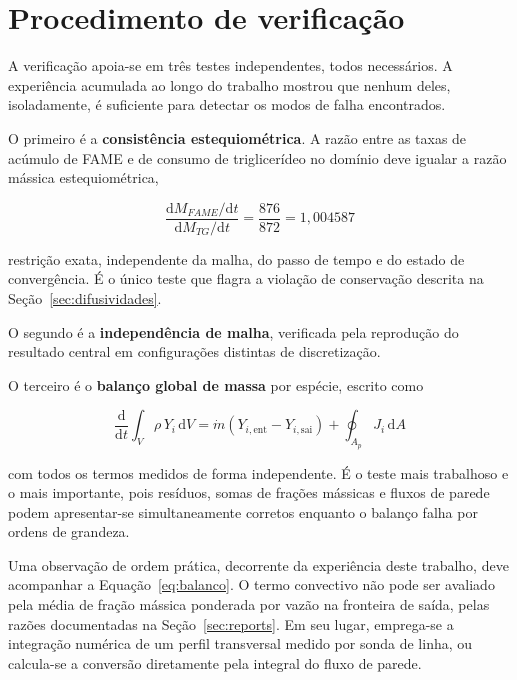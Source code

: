 \section{Procedimento de verificação}
\label{sec:verificacao}

A verificação apoia-se em três testes independentes, todos necessários. A
experiência acumulada ao longo do trabalho mostrou que nenhum deles,
isoladamente, é suficiente para detectar os modos de falha encontrados.

O primeiro é a \textbf{consistência estequiométrica}. A razão entre as taxas de
acúmulo de FAME e de consumo de triglicerídeo no domínio deve igualar a razão
mássica estequiométrica,

\begin{equation}
\frac{\mathrm{d}M_{FAME}/\mathrm{d}t}{\mathrm{d}M_{TG}/\mathrm{d}t}
= \frac{876}{872} = 1{,}004587
\label{eq:esteq}
\end{equation}

\noindent
restrição exata, independente da malha, do passo de tempo e do estado de
convergência. É o único teste que flagra a violação de conservação descrita na
Seção~\ref{sec:difusividades}.

O segundo é a \textbf{independência de malha}, verificada pela reprodução do
resultado central em configurações distintas de discretização.

O terceiro é o \textbf{balanço global de massa} por espécie, escrito como

\begin{equation}
\frac{\mathrm{d}}{\mathrm{d}t} \int_V \rho\, Y_i\, \mathrm{d}V
= \dot{m}\left( Y_{i,\text{ent}} - Y_{i,\text{sai}} \right) + \oint_{A_p} J_i\, \mathrm{d}A
\label{eq:balanco}
\end{equation}

\noindent
com todos os termos medidos de forma independente. É o teste mais trabalhoso e o
mais importante, pois resíduos, somas de frações mássicas e fluxos de parede
podem apresentar-se simultaneamente corretos enquanto o balanço falha por ordens
de grandeza.

Uma observação de ordem prática, decorrente da experiência deste trabalho, deve
acompanhar a Equação~\eqref{eq:balanco}. O termo convectivo não pode ser
avaliado pela média de fração mássica ponderada por vazão na fronteira de saída,
pelas razões documentadas na Seção~\ref{sec:reports}. Em seu lugar, emprega-se a
integração numérica de um perfil transversal medido por sonda de linha, ou
calcula-se a conversão diretamente pela integral do fluxo de parede.

